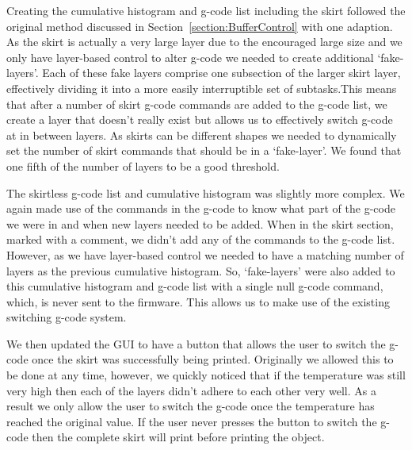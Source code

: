 \documentclass[pdftex, 11pt]{report} %
\begin{document}
Creating the cumulative histogram and g-code list including the skirt followed the original method discussed in Section~\ref{section:BufferControl} with one adaption. As the skirt is actually a very large layer due to the encouraged large size and we only have layer-based control to alter g-code we needed to create additional `fake-layers'. Each of these fake layers comprise one subsection of the larger skirt layer, effectively dividing it into a more easily interruptible set of subtasks.This means that after a number of skirt g-code commands are added to the g-code list, we create a layer that doesn't really exist but allows us to effectively switch g-code at in between layers. As skirts can be different shapes we needed to dynamically set the number of skirt commands that should be in a `fake-layer'. We found that one fifth of the number of layers to be a good threshold. 

The skirtless g-code list and cumulative histogram was slightly more complex. We again made use of the commands in the g-code to know what part of the g-code we were in and when new layers needed to be added. When in the skirt section, marked with a comment, we didn't add any of the commands to the g-code list. However, as we have layer-based control we needed to have a matching number of layers as the previous cumulative histogram. So, `fake-layers' were also added to this cumulative histogram and g-code list with a single null g-code command, which, is never sent to the firmware. This allows us to make use of the existing switching g-code system. 

We then updated the GUI to have a button that allows the user to switch the g-code once the skirt was successfully being printed. Originally we allowed this to be done at any time, however, we quickly noticed that if the temperature was still very high then each of the layers didn't adhere to each other very well. As a result we only allow the user to switch the g-code once the temperature has reached the original value. If the user never presses the button to switch the g-code then the complete skirt will print before printing the object.
\end{document}
